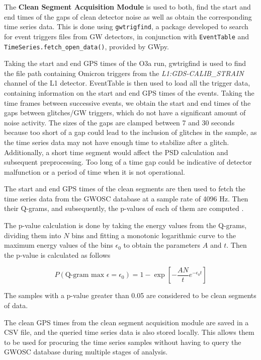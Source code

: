\documentclass[12pt]{article}
\begin{document}
\noindent The \textbf{Clean Segment Acquisition Module} is used to both, find the start and end times of the gaps of clean detector noise as well as obtain the corresponding time series data. This is done using \texttt{gwtrigfind}, a package developed to search for event triggers files from GW detectors, in conjunction with \texttt{EventTable} and \texttt{TimeSeries.fetch\_open\_data()}, provided by GWpy.

\medskip
\noindent Taking the start and end GPS times of the O3a run, gwtrigfind is used to find the file path containing Omicron triggers from the \textit{L1:GDS-CALIB\_STRAIN} channel of the L1 detector. EventTable is then used to load all the trigger data, containing information on the start and end GPS times of the events. Taking the time frames between successive events, we obtain the start and end times of the gaps between glitches/GW triggers, which do not have a significant amount of noise activity. The sizes of the gaps are clamped between 7 and 30 seconds because too short of a gap could lead to the inclusion of glitches in the sample, as the time series data may not have enough time to stabilize after a glitch. Additionally, a short time segment would affect the PSD calculation and subsequent preprocessing. Too long of a time gap could be indicative of detector malfunction or a period of time when it is not operational.

\medskip
\noindent The start and end GPS times of the clean segments are then used to fetch the time series data from the GWOSC database at a sample rate of 4096 Hz. Then their Q-grams, and subsequently, the p-values of each of them are computed \cite{vazsonyi_identifying_2023}.

\medskip
\noindent The p-value calculation is done by taking the energy values from the Q-grams, dividing them into $N$ bins and fitting a monotonic logarithmic curve to the maximum energy values of the bins $\epsilon_0$ to obtain the parameters $A$ and $t$. Then the p-value is calculated as follows

\begin{equation}
    P(\text{Q-gram max } \epsilon = \epsilon_0) = 1 - \exp\left[ -\frac{AN}{t} e^{-\epsilon_0 t} \right]
    \label{eq:qgram_pvalue}
\end{equation}

\medskip
\noindent The samples with a p-value greater than 0.05 are considered to be clean segments of data.

\medskip
\noindent The clean GPS times from the clean segment acquisition module are saved in a CSV file, and the queried time series data is also stored locally. This allows them to be used for procuring the time series samples without having to query the GWOSC database during multiple stages of analysis.
\end{document}
